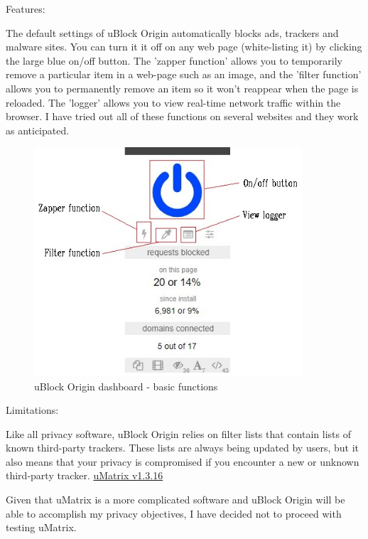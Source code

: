 \documentclass{article}
\begin{document}
\noindent Features:

The default settings of uBlock Origin automatically blocks ads, trackers and malware sites. You can turn it it off on any web page (white-listing it) by clicking the large blue on/off button. The 'zapper function' allows you to temporarily remove a particular item in a web-page such as an image, and the 'filter function' allows you to permanently remove an item so it won't reappear when the page is reloaded. The 'logger' allows you to view real-time network traffic within the browser. I have tried out all of these functions on several websites and they work as anticipated. 

\begin{figure}[htp]
    \centering
    \includegraphics[width=10cm]{Functions labeled.jpg}
    \caption{uBlock Origin dashboard - basic functions}
    \label{fig:uBlock Origin dashboard}
\end{figure}

\noindent Limitations: \newline

Like all privacy software, uBlock Origin relies on filter lists that contain lists of known third-party trackers. These lists are always being updated by users, but it also means that your privacy is compromised if you encounter a new or unknown third-party tracker.\newline
\newline
\noindent\href{https://github.com/gorhill/uMatrix}{uMatrix v1.3.16}

Given that uMatrix is a more complicated software and uBlock Origin will be able to accomplish my privacy objectives, I have decided not to proceed with testing uMatrix.\newline
\end{document}
